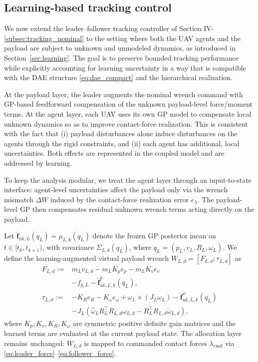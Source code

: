 \documentclass[letterpaper, 10 pt, conference]{ieeeconf}  %
\newcommand{\0}{\matr{0}}
\begin{document}
\subsection{Learning-based tracking control}
\label{subsec:tracking_learning}

We now extend the leader--follower tracking controller of
Section IV-\ref{subsec:tracking_nominal} to the setting where both the UAV agents and the payload
are subject to unknown and unmodeled dynamics, as introduced in Section~\ref{sec:learning}.
The goal is to preserve bounded tracking performance while explicitly accounting for learning
uncertainty in a way that is compatible with the DAE structure \eqref{eq:dae_compact} and the
hierarchical realization.


At the payload layer, the leader augments the nominal wrench command with GP-based feedforward
compensation of the unknown payload-level force/moment terms. At the agent layer, each UAV uses
its own GP model to compensate local unknown dynamics so as to improve contact-force realization.
This is consistent with the fact that (i) payload disturbances alone induce disturbances on the
agents through the rigid constraints, and (ii) each agent has additional, local
uncertainties. Both effects are represented in the coupled model and are addressed by learning.

To keep the analysis modular, we treat the agent layer through an input-to-state interface:
agent-level uncertainties affect the payload only via the wrench mismatch $\Delta W$ induced by
the contact-force realization error $e_\lambda$.
The payload-level GP then compensates residual unknown wrench terms acting directly on the payload.


Let $\hat{\mathbf f}_{uk,L}(q_L)=\mu_{L,k}(q_L)$ denote the frozen GP posterior mean on
$t\in[t_k,t_{k+1})$, with covariance $\Sigma_{L,k}(q_L)$, where
$q_L=(p_L,v_L,R_L,\omega_L)$.
We define the learning-augmented virtual payload wrench $W_{L,d}=[F_{L,d};\tau_{L,d}]$ as
\begin{align}
F_{L,d}
:=&
m_L\dot v_{L,d}
- m_LK_p e_p - m_LK_v e_v\nonumber\\
&- f_{g,L}
- \hat{\mathbf f}^{p}_{uk,L,k}(q_L),
\label{eq:payload_force_cmd_learning}\\
\tau_{L,d}
:=&
-K_R e_R - K_\omega e_\omega
+ \omega_L\times(J_L\omega_L)- \hat{\mathbf f}^{\omega}_{uk,L,k}(q_L)\nonumber\\
&
- J_L\!\left(\hat\omega_L R_L^\top R_{L,d}\omega_{L,d}
- R_L^\top R_{L,d}\dot\omega_{L,d}\right),
\label{eq:payload_torque_cmd_learning}
\end{align}
where $K_p,K_v,K_R,K_\omega$ are symmetric positive definite gain matrices and the learned
terms are evaluated at the current payload state.
The allocation layer remains unchanged: $W_{L,d}$ is mapped to commanded contact forces
$\lambda_{\mathrm{cmd}}$ via \eqref{eq:leader_force}--\eqref{eq:follower_force}.
\end{document}
